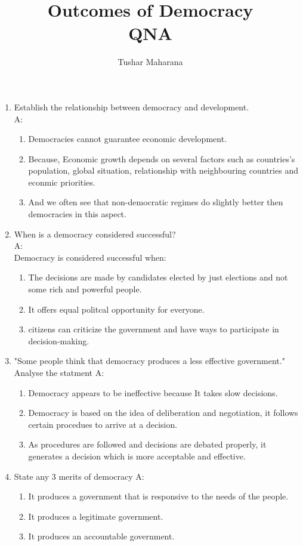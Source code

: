 \documentclass[twocolumn]{article}
\title{Outcomes of Democracy \\ QNA}
\author{Tushar Maharana}
\theoremstyle{mytheoremstyle}
\theoremstyle{mytheoremstyle}
\theoremstyle{myproblemstyle}
\begin{document}
    \maketitle
    \begin{enumerate}
        \item Establish the relationship between democracy and development.\\
        A: \\
        \begin{enumerate}
        \item Democracies cannot guarantee economic development.
        \item Because, Economic growth depends on several factors such as countries's population, global situation, relationship with neighbouring countries and econmic priorities.
        \item And we often see that non-democratic regimes do slightly better then democracies in this aspect.
        \end{enumerate}
        \item When is a democracy considered successful? \\
        A: \\ Democracy is considered successful when:
        \begin{enumerate}
        \item The decisions are made by candidates elected by just elections and not some rich and powerful people.
        \item It offers equal politcal opportunity for everyone.
        \item citizens can criticize the government and have ways to participate in decision-making.
        \end{enumerate}
        \item "Some people think that democracy produces a less effective government." Analyse the statment\newline
        A: \newline
        \begin{enumerate}
        \item Democracy appears to be ineffective because It takes slow decisions.
        \item Democracy is based on the idea of deliberation and negotiation, it follows certain procedues to arrive at a decision.
        \item As procedures are followed and decisions are debated properly, it generates a decision which is more acceptable and effective. 
        \end{enumerate}
        \item State any 3 merits of democracy\newline
        A: \newline
        \begin{enumerate}
        \item It produces a government that is responsive to the needs of the people.
        \item It produces a legitimate government.
        \item It produces an accountable government.
        \end{enumerate}
    \end{enumerate}
\end{document}
